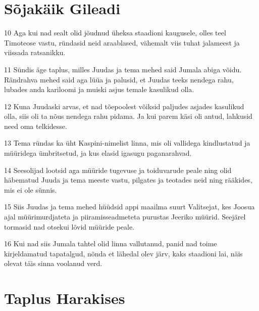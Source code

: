 \section*{Sõjakäik Gileadi}

\par 10 Aga kui nad sealt olid jõudnud üheksa staadioni kaugusele, olles teel Timoteose vastu, ründasid neid araablased, vähemalt viis tuhat jalameest ja viissada ratsanikku.
\par 11 Sündis äge taplus, milles Juudas ja tema mehed said Jumala abiga võidu. Rändrahva mehed said aga lüüa ja palusid, et Juudas teeks nendega rahu, lubades anda kariloomi ja muiski asjus temale kasulikud olla.
\par 12 Kuna Juudaski arvas, et nad tõepoolest võiksid paljudes asjades kasulikud olla, siis oli ta nõus nendega rahu pidama. Ja kui parem käsi oli antud, lahkusid need oma telkidesse.
\par 13 Tema ründas ka üht Kaspini-nimelist linna, mis oli vallidega kindlustatud ja müüridega ümbritsetud, ja kus elasid igasugu paganarahvad.
\par 14 Seesolijad lootsid aga müüride tugevuse ja toiduvarude peale ning olid häbematud Juuda ja tema meeste vastu, pilgates ja teotades neid ning rääkides, mis ei ole sünnis.
\par 15 Siis Juudas ja tema mehed hüüdsid appi maailma suurt Valitsejat, kes Joosua ajal müürimurdjateta ja piiramisseadmeteta purustas Jeeriko müürid. Seejärel tormasid nad otsekui lõvid müüride peale.
\par 16 Kui nad siis Jumala tahtel olid linna vallutanud, panid nad toime kirjeldamatud tapatalgud, nõnda et lähedal olev järv, kaks staadioni lai, näis olevat täis sinna voolanud verd.


\section*{Taplus Harakises}

